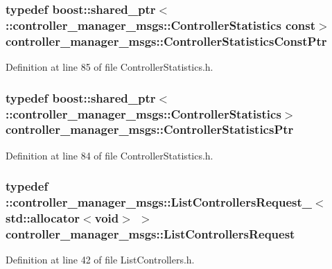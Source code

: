 \subsubsection[{\-Controller\-Statistics\-Const\-Ptr}]{\setlength{\rightskip}{0pt plus 5cm}typedef boost\-::shared\-\_\-ptr$<$ \-::{\bf controller\-\_\-manager\-\_\-msgs\-::\-Controller\-Statistics} const$>$ {\bf controller\-\_\-manager\-\_\-msgs\-::\-Controller\-Statistics\-Const\-Ptr}}\label{namespacecontroller__manager__msgs_a85d74a19701d39c7f6a4b8f8456dae4d}


\-Definition at line 85 of file \-Controller\-Statistics.\-h.

\subsubsection[{\-Controller\-Statistics\-Ptr}]{\setlength{\rightskip}{0pt plus 5cm}typedef boost\-::shared\-\_\-ptr$<$ \-::{\bf controller\-\_\-manager\-\_\-msgs\-::\-Controller\-Statistics}$>$ {\bf controller\-\_\-manager\-\_\-msgs\-::\-Controller\-Statistics\-Ptr}}\label{namespacecontroller__manager__msgs_a8329b076b08c90e756534d158d21677c}


\-Definition at line 84 of file \-Controller\-Statistics.\-h.

\subsubsection[{\-List\-Controllers\-Request}]{\setlength{\rightskip}{0pt plus 5cm}typedef \-::{\bf controller\-\_\-manager\-\_\-msgs\-::\-List\-Controllers\-Request\-\_\-}$<$std\-::allocator$<$void$>$ $>$ {\bf controller\-\_\-manager\-\_\-msgs\-::\-List\-Controllers\-Request}}\label{namespacecontroller__manager__msgs_a43c2ab1ec2ae1f6bef0c1897a92b1a98}


\-Definition at line 42 of file \-List\-Controllers.\-h.

